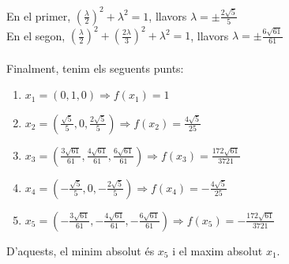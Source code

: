 \documentclass[a4paper, 12pt]{article}
\begin{document}
\begin{solucio}
        En el primer, $\left(\frac{\lambda}{2}\right)^2+\lambda^2 = 1$, llavors $\lambda = \pm\frac{2\sqrt{5}}{5}$\\
        En el segon, $\left(\frac{\lambda}{2}\right)^2+\left(\frac{2\lambda}{3}\right)^2+\lambda^2 = 1$,
        llavors $\lambda = \pm\frac{6\sqrt{61}}{61}$\\\\
        Finalment, tenim els seguents punts:
        \begin{enumerate}
            \item $x_1 = \left(0, 1, 0\right) \Rightarrow f(x_1) = 1$
            \item $x_2 = \left(\frac{\sqrt{5}}{5}, 0, \frac{2\sqrt{5}}{5}\right) \Rightarrow f(x_2) = \frac{4\sqrt{5}}{25}$
            \item $x_3 = \left(\frac{3\sqrt{61}}{61}, \frac{4\sqrt{61}}{61}, \frac{6\sqrt{61}}{61}\right) \Rightarrow f(x_3) = \frac{172\sqrt{61}}{3721}$
            \item $x_4 = \left(-\frac{\sqrt{5}}{5}, 0, -\frac{2\sqrt{5}}{5}\right) \Rightarrow f(x_4) = -\frac{4\sqrt{5}}{25}$
            \item $x_5 = \left(-\frac{3\sqrt{61}}{61}, -\frac{4\sqrt{61}}{61}, -\frac{6\sqrt{61}}{61}\right) \Rightarrow f(x_5) = -\frac{172\sqrt{61}}{3721}$
        \end{enumerate}
        D'aquests, el minim absolut és $x_5$ i el maxim absolut $x_1$.
    \end{solucio}
\end{document}
